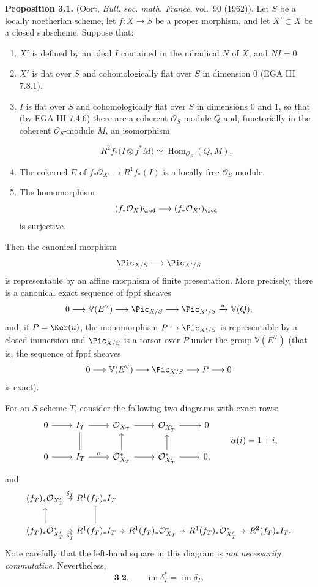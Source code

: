 \textbf{Proposition 3.1.} (Oort, \emph{Bull. soc. math. France}, vol.~90
(1962)). Let $S$ be a locally noetherian scheme, let $f:X\to S$ be a proper
morphism, and let $X'\subset X$ be a closed subscheme. Suppose that:
\begin{enumerate}[label=\roman*)]
\item $X'$ is defined by an ideal $I$ contained in the nilradical $N$ of
  $X$, and $NI=0$.
\item $X'$ is flat over $S$ and cohomologically flat over $S$ in dimension
  $0$ (EGA III 7.8.1).
\item $I$ is flat over $S$ and cohomologically flat over $S$ in dimensions
  $0$ and $1$, so that (by EGA III 7.4.6) there are a coherent
  $\mathcal O_S$-module $Q$ and, functorially in the coherent
  $\mathcal O_S$-module $M$, an isomorphism

\[
  R^2f_*\bigl(I\otimes f^*M\bigr)
  \simeq\operatorname{Hom}_{\mathcal O_S}(Q,M).
\]
\item The cokernel $E$ of
  $f_*\mathcal O_{X'}\to R^1f_*(I)$ is a locally free
  $\mathcal O_S$-module.
\item The homomorphism
  \[
    (f_*\mathcal O_X)_{\red}
    \longrightarrow(f_*\mathcal O_{X'})_{\red}
  \]
  is surjective.
\end{enumerate}
Then the canonical morphism
\[
  \Pic_{X/S}\longrightarrow\Pic_{X'/S}
\]
is representable by an affine morphism of finite presentation. More
precisely, there is a canonical exact sequence of fppf sheaves
\[
  0\longrightarrow\mathbb V(E^\vee)\longrightarrow\Pic_{X/S}
  \longrightarrow\Pic_{X'/S}\xrightarrow{u}\mathbb V(Q),
\]
and, if $P=\Ker(u)$, the monomorphism
$P\hookrightarrow\Pic_{X'/S}$ is representable by a closed immersion and
$\Pic_{X/S}$ is a torsor over $P$ under the group $\mathbb V(E^\vee)$
(that is, the sequence of fppf sheaves
\[
  0\longrightarrow\mathbb V(E^\vee)\longrightarrow\Pic_{X/S}
  \longrightarrow P\longrightarrow0
\]
is exact).

For an $S$-scheme $T$, consider the following two diagrams with exact rows:
\[
\begin{tikzcd}
0 \arrow[r] & I_T \arrow[r] & \mathcal O_{X_T} \arrow[r] &
  \mathcal O_{X'_T} \arrow[r] & 0\\
0 \arrow[r] & I_T \arrow[r,"\alpha"] \arrow[u,equal] &
  \mathcal O_{X_T}^{*} \arrow[r] \arrow[u] &
  \mathcal O_{X'_T}^{*} \arrow[r] \arrow[u] & 0,
\end{tikzcd}
\qquad \alpha(i)=1+i,
\]
and
\[
\begin{tikzcd}[column sep=tiny]
(f_T)_*\mathcal O_{X'_T} \arrow[r,"\delta_T"] &
  R^1(f_T)_*I_T \arrow[d,equal]\\
(f_T)_*\mathcal O_{X'_T}^{*} \arrow[r,"\delta_T^*"'] \arrow[u] &
  R^1(f_T)_*I_T \arrow[r] &
  R^1(f_T)_*\mathcal O_{X_T}^{*} \arrow[r] &
  R^1(f_T)_*\mathcal O_{X'_T}^{*} \arrow[r] &
  R^2(f_T)_*I_T.
\end{tikzcd}
\]
Note carefully that the left-hand square in this diagram is \emph{not
necessarily commutative}. Nevertheless,
\[
  \textbf{3.2.}\qquad \operatorname{im}\delta_T^*
  =\operatorname{im}\delta_T.
\]

